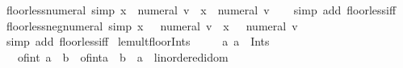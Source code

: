 \begin{isabellebody}
\endisatagproof
{\isafoldproof}%
%
\isadelimproof
\isanewline
%
\endisadelimproof
\isanewline
{}\isamarkupfalse%
\ floor{\isacharunderscore}{\kern0pt}less{\isacharunderscore}{\kern0pt}numeral\ {\isacharbrackleft}{\kern0pt}simp{\isacharbrackright}{\kern0pt}{\isacharcolon}{\kern0pt}\ {\isachardoublequoteopen}{\isasymlfloor}x{\isasymrfloor}\ {\isacharless}{\kern0pt}\ numeral\ v\ {\isasymlongleftrightarrow}\ x\ {\isacharless}{\kern0pt}\ numeral\ v{\isachardoublequoteclose}\isanewline
%
\isadelimproof
\ \ %
\endisadelimproof
%
\isatagproof
{}\isamarkupfalse%
\ {\isacharparenleft}{\kern0pt}simp\ add{\isacharcolon}{\kern0pt}\ floor{\isacharunderscore}{\kern0pt}less{\isacharunderscore}{\kern0pt}iff{\isacharparenright}{\kern0pt}%
\endisatagproof
{\isafoldproof}%
%
\isadelimproof
\isanewline
%
\endisadelimproof
\isanewline
{}\isamarkupfalse%
\ floor{\isacharunderscore}{\kern0pt}less{\isacharunderscore}{\kern0pt}neg{\isacharunderscore}{\kern0pt}numeral\ {\isacharbrackleft}{\kern0pt}simp{\isacharbrackright}{\kern0pt}{\isacharcolon}{\kern0pt}\ {\isachardoublequoteopen}{\isasymlfloor}x{\isasymrfloor}\ {\isacharless}{\kern0pt}\ {\isacharminus}{\kern0pt}\ numeral\ v\ {\isasymlongleftrightarrow}\ x\ {\isacharless}{\kern0pt}\ {\isacharminus}{\kern0pt}\ numeral\ v{\isachardoublequoteclose}\isanewline
%
\isadelimproof
\ \ %
\endisadelimproof
%
\isatagproof
{}\isamarkupfalse%
\ {\isacharparenleft}{\kern0pt}simp\ add{\isacharcolon}{\kern0pt}\ floor{\isacharunderscore}{\kern0pt}less{\isacharunderscore}{\kern0pt}iff{\isacharparenright}{\kern0pt}%
\endisatagproof
{\isafoldproof}%
%
\isadelimproof
\isanewline
%
\endisadelimproof
\isanewline
{}\isamarkupfalse%
\ le{\isacharunderscore}{\kern0pt}mult{\isacharunderscore}{\kern0pt}floor{\isacharunderscore}{\kern0pt}Ints{\isacharcolon}{\kern0pt}\isanewline
\ \ \ {\isachardoublequoteopen}{}\ {\isasymle}\ a{\isachardoublequoteclose}\ {\isachardoublequoteopen}a\ {\isasymin}\ Ints{\isachardoublequoteclose}\isanewline
\ \ \ {\isachardoublequoteopen}of{\isacharunderscore}{\kern0pt}int\ {\isacharparenleft}{\kern0pt}{\isasymlfloor}a{\isasymrfloor}\ {\isacharasterisk}{\kern0pt}\ {\isasymlfloor}b{\isasymrfloor}{\isacharparenright}{\kern0pt}\ {\isasymle}\ {\isacharparenleft}{\kern0pt}of{\isacharunderscore}{\kern0pt}int{\isasymlfloor}a\ {\isacharasterisk}{\kern0pt}\ b{\isasymrfloor}\ {\isacharcolon}{\kern0pt}{\isacharcolon}{\kern0pt}\ {\isacharprime}{\kern0pt}a\ {\isacharcolon}{\kern0pt}{\isacharcolon}{\kern0pt}\ linordered{\isacharunderscore}{\kern0pt}idom{\isacharparenright}{\kern0pt}{\isachardoublequoteclose}\isanewline

\end{isabellebody}
